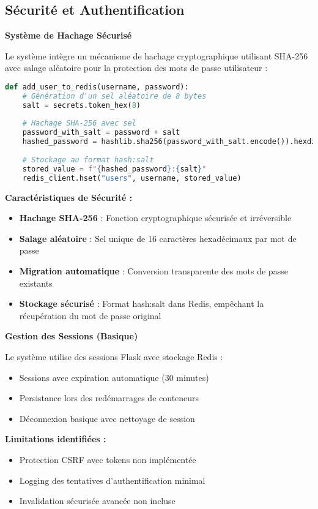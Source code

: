 \documentclass[12pt,a4paper]{article}
\begin{document}
\subsection{Sécurité et Authentification}

\begin{implementedbox}
\textbf{Système de Hachage Sécurisé}

Le système intègre un mécanisme de hachage cryptographique utilisant SHA-256 avec salage aléatoire pour la protection des mots de passe utilisateur :

\begin{lstlisting}[language=Python, caption=Implémentation du hachage sécurisé]
def add_user_to_redis(username, password):
    # Génération d'un sel aléatoire de 8 bytes
    salt = secrets.token_hex(8)
    
    # Hachage SHA-256 avec sel
    password_with_salt = password + salt
    hashed_password = hashlib.sha256(password_with_salt.encode()).hexdigest()
    
    # Stockage au format hash:salt
    stored_value = f"{hashed_password}:{salt}"
    redis_client.hset("users", username, stored_value)
\end{lstlisting}
\end{implementedbox}
\begin{implementedbox}
\textbf{Caractéristiques de Sécurité :}
\begin{itemize}
    \item \textbf{Hachage SHA-256} : Fonction cryptographique sécurisée et irréversible
    \item \textbf{Salage aléatoire} : Sel unique de 16 caractères hexadécimaux par mot de passe
    \item \textbf{Migration automatique} : Conversion transparente des mots de passe existants
    \item \textbf{Stockage sécurisé} : Format hash:salt dans Redis, empêchant la récupération du mot de passe original
\end{itemize}
\end{implementedbox}

\begin{partialbox}
\textbf{Gestion des Sessions (Basique)}

Le système utilise des sessions Flask avec stockage Redis :
\begin{itemize}
    \item Sessions avec expiration automatique (30 minutes)
    \item Persistance lors des redémarrages de conteneurs
    \item Déconnexion basique avec nettoyage de session
\end{itemize}

\textbf{Limitations identifiées :}
\begin{itemize}
    \item Protection CSRF avec tokens non implémentée
    \item Logging des tentatives d'authentification minimal
    \item Invalidation sécurisée avancée non incluse
\end{itemize}
\end{partialbox}
\end{document}
